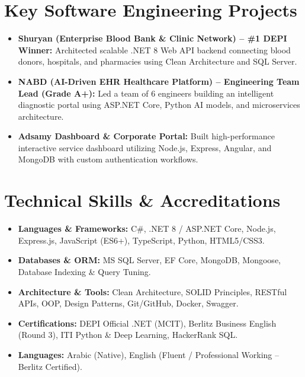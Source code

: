\documentclass[11pt,a4paper]{article}
\begin{document}
\section{Key Software Engineering Projects}
\begin{itemize}[leftmargin=*, nosep]
    \item \textbf{Shuryan (Enterprise Blood Bank \& Clinic Network) -- \#1 DEPI Winner:} Architected scalable .NET 8 Web API backend connecting blood donors, hospitals, and pharmacies using Clean Architecture and SQL Server.
    \item \textbf{NABD (AI-Driven EHR Healthcare Platform) -- Engineering Team Lead (Grade A+):} Led a team of 6 engineers building an intelligent diagnostic portal using ASP.NET Core, Python AI models, and microservices architecture.
    \item \textbf{Adsamy Dashboard \& Corporate Portal:} Built high-performance interactive service dashboard utilizing Node.js, Express, Angular, and MongoDB with custom authentication workflows.
\end{itemize}

\section{Technical Skills \& Accreditations}
\begin{itemize}[leftmargin=*, nosep]
    \item \textbf{Languages \& Frameworks:} C\#, .NET 8 / ASP.NET Core, Node.js, Express.js, JavaScript (ES6+), TypeScript, Python, HTML5/CSS3.
    \item \textbf{Databases \& ORM:} MS SQL Server, EF Core, MongoDB, Mongoose, Database Indexing \& Query Tuning.
    \item \textbf{Architecture \& Tools:} Clean Architecture, SOLID Principles, RESTful APIs, OOP, Design Patterns, Git/GitHub, Docker, Swagger.
    \item \textbf{Certifications:} DEPI Official .NET (MCIT), Berlitz Business English (Round 3), ITI Python \& Deep Learning, HackerRank SQL.
    \item \textbf{Languages:} Arabic (Native), English (Fluent / Professional Working -- Berlitz Certified).
\end{itemize}
\end{document}
